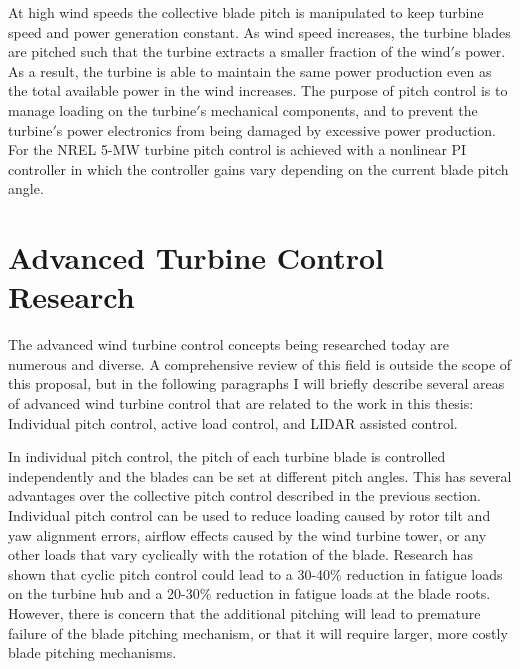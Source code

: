 At high wind speeds the collective blade pitch is manipulated to keep turbine speed and power generation constant. As wind speed increases, the turbine blades are pitched such that the turbine extracts a smaller fraction of the wind$'$s power.  As a result, the turbine is able to maintain the same power production even as the total available power in the wind increases.  The purpose of pitch control is to manage loading on the turbine$'$s mechanical components, and to prevent the turbine$'$s power electronics from being damaged by excessive power production.   For the NREL 5-MW turbine pitch control is achieved with a nonlinear PI controller in which the controller gains vary depending on the current blade pitch angle. 


\section{Advanced Turbine Control Research} 

The advanced wind turbine control concepts being researched today are numerous and diverse. A comprehensive review of this field is outside the scope of this proposal, but in the following paragraphs I will briefly describe several areas of advanced wind turbine control that are related to the work in this thesis: Individual pitch control, active load control, and LIDAR assisted control.

In individual pitch control, the pitch of each turbine blade is controlled independently and the blades can be set at different pitch angles.  This has several advantages over the collective pitch control described in the previous section. Individual pitch control can be used to reduce loading caused by rotor tilt and yaw alignment errors, airflow effects caused by the wind turbine tower, or any other loads that vary cyclically with the rotation of the blade. Research has shown that cyclic pitch control could lead to a 30-40\% reduction in fatigue loads on the turbine hub and a 20-30\% reduction in fatigue loads at the blade roots.\cite{larsen2005,bossanyi2004} However, there is concern that the additional pitching will lead to premature failure of the blade pitching mechanism, or that it will require larger, more costly blade pitching mechanisms.\cite{vandam2008}

